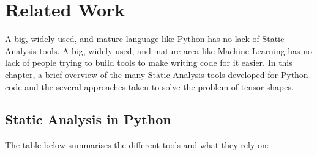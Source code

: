 \chapter{Related Work}\label{related-work}

{}

A big, widely used, and mature language like Python has no lack of
Static Analysis tools. A big, widely used, and mature area like Machine
Learning has no lack of people trying to build tools to make writing
code for it easier. In this chapter, a brief overview of the many Static
Analysis tools developed for Python code and the several approaches
taken to solve the problem of tensor shapes.

\section{Static Analysis in Python}\label{static-analysis-in-python}

{}

{}

The table below summarises the different tools and what they rely on:

